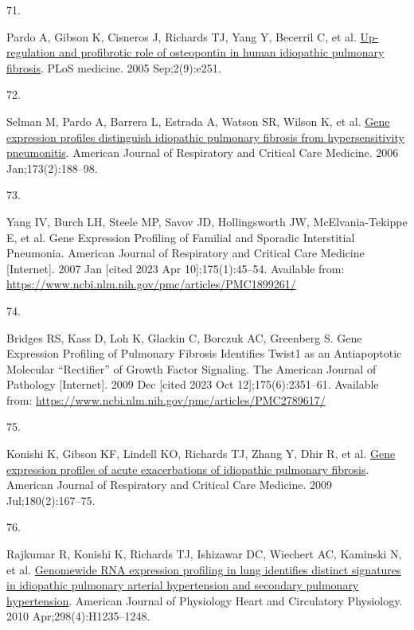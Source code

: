 \documentclass[
]{article}
\newlength{\cslhangindent}
\newlength{\csllabelwidth}
\newenvironment{CSLReferences}[2] %
 {\begin{list}{}{%
  \setlength{\itemindent}{0pt}
  \setlength{\leftmargin}{0pt}
  \setlength{\parsep}{0pt}
  \ifodd #1
   \setlength{\leftmargin}{\cslhangindent}
   \setlength{\itemindent}{-1\cslhangindent}
  \fi
  \setlength{\itemsep}{#2\baselineskip}}}
 {\end{list}}
\newcommand{\CSLLeftMargin}[1]{\parbox[t]{\csllabelwidth}{\strut#1\strut}}
\newcommand{\CSLRightInline}[1]{\parbox[t]{\linewidth - \csllabelwidth}{\strut#1\strut}}
\begin{document}
\begin{CSLReferences}{0}{1}
\CSLLeftMargin{71. }%
\CSLRightInline{Pardo A, Gibson K, Cisneros J, Richards TJ, Yang Y, Becerril C, et al. \href{https://doi.org/10.1371/journal.pmed.0020251}{Up-regulation and profibrotic role of osteopontin in human idiopathic pulmonary fibrosis}. PLoS medicine. 2005 Sep;2(9):e251. }

\CSLLeftMargin{72. }%
\CSLRightInline{Selman M, Pardo A, Barrera L, Estrada A, Watson SR, Wilson K, et al. \href{https://doi.org/10.1164/rccm.200504-644OC}{Gene expression profiles distinguish idiopathic pulmonary fibrosis from hypersensitivity pneumonitis}. American Journal of Respiratory and Critical Care Medicine. 2006 Jan;173(2):188--98. }

\CSLLeftMargin{73. }%
\CSLRightInline{Yang IV, Burch LH, Steele MP, Savov JD, Hollingsworth JW, McElvania-Tekippe E, et al. Gene {Expression} {Profiling} of {Familial} and {Sporadic} {Interstitial} {Pneumonia}. American Journal of Respiratory and Critical Care Medicine {[}Internet{]}. 2007 Jan {[}cited 2023 Apr 10{]};175(1):45--54. Available from: \url{https://www.ncbi.nlm.nih.gov/pmc/articles/PMC1899261/}}

\CSLLeftMargin{74. }%
\CSLRightInline{Bridges RS, Kass D, Loh K, Glackin C, Borczuk AC, Greenberg S. Gene {Expression} {Profiling} of {Pulmonary} {Fibrosis} {Identifies} {Twist1} as an {Antiapoptotic} {Molecular} {``{Rectifier}''} of {Growth} {Factor} {Signaling}. The American Journal of Pathology {[}Internet{]}. 2009 Dec {[}cited 2023 Oct 12{]};175(6):2351--61. Available from: \url{https://www.ncbi.nlm.nih.gov/pmc/articles/PMC2789617/}}

\CSLLeftMargin{75. }%
\CSLRightInline{Konishi K, Gibson KF, Lindell KO, Richards TJ, Zhang Y, Dhir R, et al. \href{https://doi.org/10.1164/rccm.200810-1596OC}{Gene expression profiles of acute exacerbations of idiopathic pulmonary fibrosis}. American Journal of Respiratory and Critical Care Medicine. 2009 Jul;180(2):167--75. }

\CSLLeftMargin{76. }%
\CSLRightInline{Rajkumar R, Konishi K, Richards TJ, Ishizawar DC, Wiechert AC, Kaminski N, et al. \href{https://doi.org/10.1152/ajpheart.00254.2009}{Genomewide {RNA} expression profiling in lung identifies distinct signatures in idiopathic pulmonary arterial hypertension and secondary pulmonary hypertension}. American Journal of Physiology Heart and Circulatory Physiology. 2010 Apr;298(4):H1235--1248. }


\end{CSLReferences}
\end{document}
